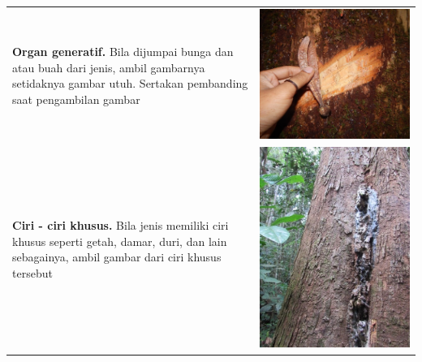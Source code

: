 \documentclass[
]{book}
\begin{document}
\begin{longtable}[]{@{}
  >{\raggedright\arraybackslash}p{}
  >{\raggedright\arraybackslash}p{}@{}}
\textbf{Organ generatif.} Bila dijumpai bunga dan atau buah dari jenis, ambil gambarnya setidaknya gambar utuh. Sertakan pembanding saat pengambilan gambar & \includegraphics{images/gkj4.jpg} \\
\textbf{Ciri - ciri khusus.} Bila jenis memiliki ciri khusus seperti getah, damar, duri, dan lain sebagainya, ambil gambar dari ciri khusus tersebut & \includegraphics{images/gkj5.jpg} \\
\bottomrule()
\end{longtable}
\end{document}
